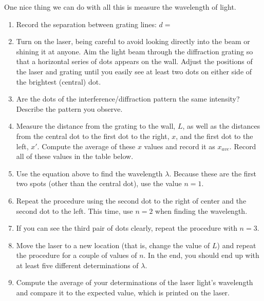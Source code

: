 One nice thing we can do with all this is measure the wavelength of light.

\bigskip
\centerline{}
\bigskip

\begin{enumerate}
\item Record the separation between grating lines: \( d= \)
\item Turn on the laser, being careful to avoid looking directly into the
beam or shining it at anyone. Aim the light beam through the diffraction
grating so that a horizontal series of dots appears on the wall. Adjust
the positions of the laser and grating until you easily see at least
two dots on either side of the brightest (central) dot.
\item Are the dots of the interference/diffraction pattern the same intensity?
Describe the pattern you observe.\vspace{15mm}

\item Measure the distance from the grating to the wall, $L$,
as well as the distances from the central dot to the first dot to
the right, $x$, and the first dot to the left, $x'$. Compute the average
of these $x$ values and record it as $x_{ave}$. Record all of these
values in the table below.
\item Use the equation above to find the wavelength $\lambda$.
Because these are the first two spots (other than the central dot),
use the value $n=1$.
\item Repeat the procedure using the second dot to the right
of center and the second dot to the left.  This time, use $n=2$ 
when finding the wavelength.
\item If you can see the third pair of dots clearly, repeat the
procedure with $n=3$.
\item Move the laser to a new location (that is, change the
value of $L$) and repeat the procedure for a couple of values
of $n$.  In the end, you should end up with at least
five different determinations of $\lambda$.
\item Compute the average of your determinations of the laser light's
  wavelength and compare it to the expected value, which is printed on the
  laser.
\vspace{15mm}

\end{enumerate}
\vspace{0.3cm}
